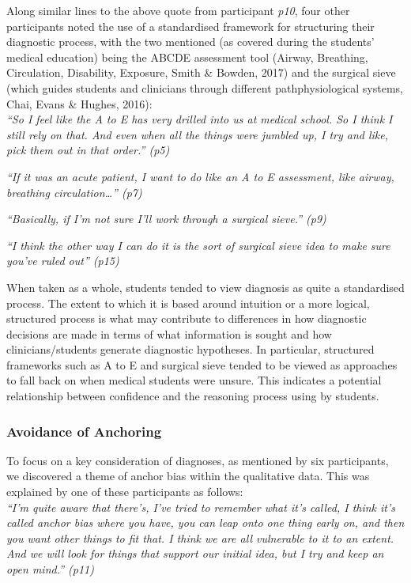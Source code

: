 \documentclass[a4paper, nobind]{templates/ociamthesis}
\begin{document}
\hfill\break
Along similar lines to the above quote from participant \emph{p10}, four other participants noted the use of a standardised framework for structuring their diagnostic process, with the two mentioned (as covered during the students' medical education) being the ABCDE assessment tool (Airway, Breathing, Circulation, Disability, Exposure, Smith \& Bowden, 2017) and the surgical sieve (which guides students and clinicians through different pathphysiological systems, Chai, Evans \& Hughes, 2016):\\

\emph{``So I feel like the A to E has very drilled into us at medical school. So I think I still rely on that. And even when all the things were jumbled up, I try and like, pick them out in that order.'' (p5)}

\emph{``If it was an acute patient, I want to do like an A to E assessment, like airway, breathing circulation\ldots{}'' (p7)}

\emph{``Basically, if I'm not sure I'll work through a surgical sieve.'' (p9)}

\emph{``I think the other way I can do it is the sort of surgical sieve idea to make sure you've ruled out'' (p15)}

\hfill\break
When taken as a whole, students tended to view diagnosis as quite a standardised process. The extent to which it is based around intuition or a more logical, structured process is what may contribute to differences in how diagnostic decisions are made in terms of what information is sought and how clinicians/students generate diagnostic hypotheses. In particular, structured frameworks such as A to E and surgical sieve tended to be viewed as approaches to fall back on when medical students were unsure. This indicates a potential relationship between confidence and the reasoning process using by students.

\subsubsection{Avoidance of Anchoring}\label{avoidance-of-anchoring}

To focus on a key consideration of diagnoses, as mentioned by six participants, we discovered a theme of anchor bias within the qualitative data. This was explained by one of these participants as follows:\\

\emph{``I'm quite aware that there's, I've tried to remember what it's called, I think it's called anchor bias where you have, you can leap onto one thing early on, and then you want other things to fit that. I think we are all vulnerable to it to an extent. And we will look for things that support our initial idea, but I try and keep an open mind.'' (p11)}\\
\end{document}
